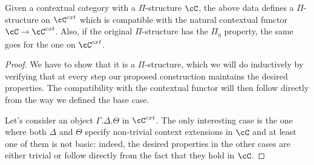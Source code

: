 \documentclass[a4paper,fontsize=12pt]{scrartcl}
\begin{document}
\begin{prop}
  Given a contextual category with a $\Pi$-structure $\cC$, the above data
  defines a $\Pi$-structure on $\cC^{cxt}$ which is compatible with the natural
  contextual functor $\cC\rightarrow\cC^{cxt}$. Also, if the original
  $\Pi$-structure has the $\Pi_\eta$ property, the same goes for the one on
  $\cC^{cxt}$.
\end{prop}
\begin{proof}
  We have to
  show that it is a $\Pi$-structure, which we will do inductively by verifying
  that at every step our proposed construction maintains the desired properties.
  The compatibility with the contextual functor will then follow directly from
  the way we defined the base case.

  Let's consider an object $\Gamma.\Delta.\Theta$ in $\cC^{cxt}$. The only
  interesting case is the one where both $\Delta$ and $\Theta$
  specify non-trivial context extensions in $\cC$ and at least one of them is
  not basic: indeed, the desired properties in the other cases are either
  trivial or follow directly from the fact that they hold in $\cC$.


\end{proof}
\end{document}

